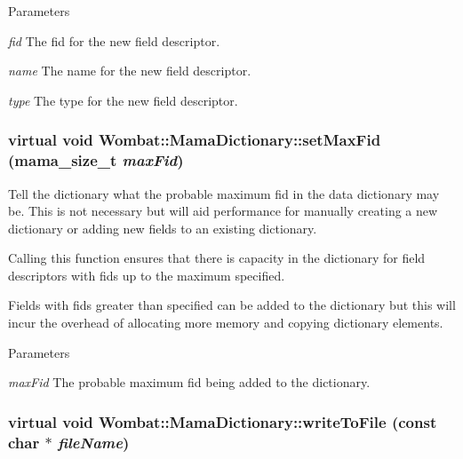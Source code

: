 \begin{DoxyParams}{Parameters}
\item[{\em fid}]The fid for the new field descriptor. \item[{\em name}]The name for the new field descriptor. \item[{\em type}]The type for the new field descriptor. \end{DoxyParams}
\hypertarget{classWombat_1_1MamaDictionary_a9f1d5e3ce24c137751e3451c9511143f}{
\subsubsection[{setMaxFid}]{\setlength{\rightskip}{0pt plus 5cm}virtual void Wombat::MamaDictionary::setMaxFid ({\bf mama\_\-size\_\-t} {\em maxFid})}}
\label{classWombat_1_1MamaDictionary_a9f1d5e3ce24c137751e3451c9511143f}


Tell the dictionary what the probable maximum fid in the data dictionary may be. This is not necessary but will aid performance for manually creating a new dictionary or adding new fields to an existing dictionary.

Calling this function ensures that there is capacity in the dictionary for field descriptors with fids up to the maximum specified.

Fields with fids greater than specified can be added to the dictionary but this will incur the overhead of allocating more memory and copying dictionary elements.


\begin{DoxyParams}{Parameters}
\item[{\em maxFid}]The probable maximum fid being added to the dictionary. \end{DoxyParams}
\hypertarget{classWombat_1_1MamaDictionary_a3f4eac5a4a67b84762f5bc96debeb530}{
\subsubsection[{writeToFile}]{\setlength{\rightskip}{0pt plus 5cm}virtual void Wombat::MamaDictionary::writeToFile (const char $\ast$ {\em fileName})}}
\label{classWombat_1_1MamaDictionary_a3f4eac5a4a67b84762f5bc96debeb530}


